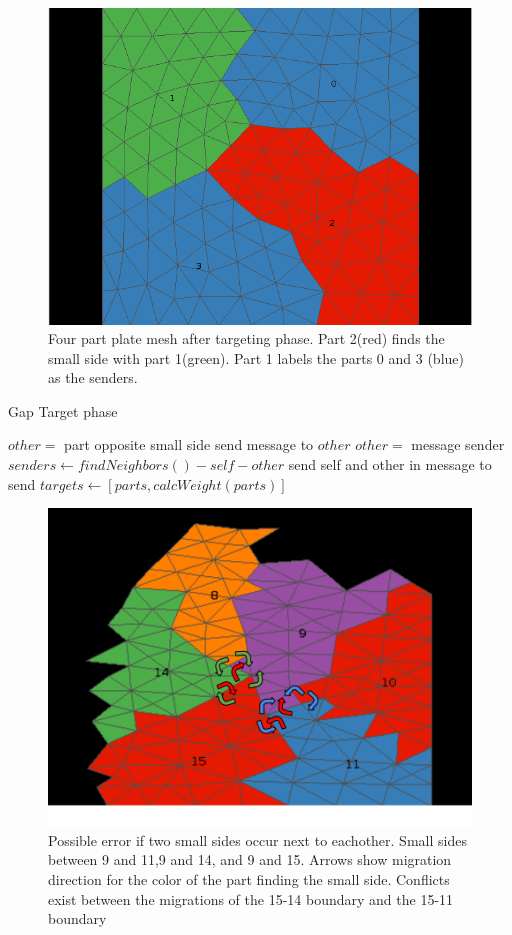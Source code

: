 \documentclass{thesis}
\let\ForEach\ForAll
\begin{document}
\begin{figure} [!h]
\centering
\captionsetup{justification=centering,margin=1cm}
\includegraphics[width=.6\textwidth]{target_example.png}
\caption{\label{fig:boundary} \textnormal{Four part plate mesh after targeting phase. Part 2(red) finds the small side with part 1(green). Part 1 labels the parts 0 and 3 (blue) as the senders.}}
\end{figure}

\begin{algorithm}
\caption{Gap Target phase}
\label{alg:targets}
\begin{algorithmic}[1]
    \State $other = $ part opposite small side
    \State send message to $other$
  \EndIf
    \State $other = $ message sender
    \State $senders \leftarrow findNeighbors() - self - other$
  \EndIf
  \ForEach {$send \in senders$}
    \State send self and other in message to send
  \EndFor
    \State $targets \leftarrow [parts,calcWeight(parts)]$
  \EndIf
\EndProcedure
\end{algorithmic}
\end{algorithm}


\begin{figure} [hb]
\centering
\captionsetup{justification=centering,margin=1cm}
\includegraphics[width=.6\textwidth]{MIS_problem.png}
\caption{\label{fig:recvsend} \textnormal{Possible error if two small sides occur next to eachother. Small sides between 9 and 11,9 and 14, and  9 and 15. Arrows show migration direction for the color of the part finding the small side. Conflicts exist between the migrations of the 15-14 boundary and the 15-11 boundary}}
\end{figure}
\end{document}
